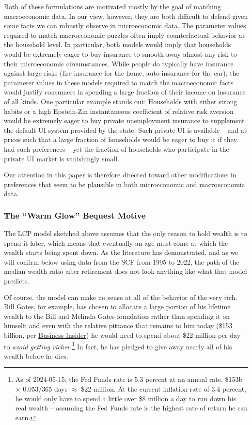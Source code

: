 \documentclass{article}
\begin{document}
Both of these formulations are motivated mostly by the goal of matching macroeconomic data.
In our view, however, they are both difficult to defend given some facts we can robustly observe in microeconomic data. The parameter values required to match macroeconomic puzzles often imply counterfactual behavior at the household level.
In particular, both models would imply that households would be extremely eager to buy insurance to smooth away almost any risk to their microeconomic circumstances.
While people do typically have insurance against large risks (fire insurance for the home, auto insurance for the car), the parameter values in these models required to match the macroeconomic facts would justify consumers in spending a large fraction of their income on insurance of all kinds.
One particular example stands out: Households with either strong habits or a high Epstein-Zin instantaneous coefficient of relative risk aversion would be extremely eager to buy private unemployment insurance to supplement the default UI system provided by the state.
Such private UI is available -- and at prices such that a large fraction of households would be eager to buy it if they had such preferences -- yet the fraction of households who participate in the private UI market is vanishingly small.

Our attention in this paper is therefore directed toward other modifications in preferences that seem to be plausible in both microeconomic and macroeconomic data.

\subsubsection{The ``Warm Glow'' Bequest Motive}

The LCP model sketched above assumes that the only reason to hold wealth is to spend it later, which means that eventually an age must come at which the wealth starts being spent down.
As the literature has demonstrated, and as we will confirm below using data from the SCF from 1995 to 2022, the path of the median wealth ratio after retirement does not look anything like what that model predicts.

Of course, the model can make no sense at all of the behavior of the very rich.
Bill Gates, for example, has chosen to allocate a large portion of his lifetime wealth to the Bill and Melinda Gates foundation rather than spending it on himself; and even with the relative pittance that remains to him today (\$153 billion, per \href{https://www.businessinsider.com/how-bill-gates-spends-fortune}{Business Insider}) he would need to spend about \$22 million per day to \textit{avoid getting richer}.\footnote{As of 2024-05-15, the Fed Funds rate is 5.3 percent at an annual rate.
\$153b $\times$ 0.053/365 days $\approx$ \$22 million.
At the current inflation rate of 3.4 percent, he would only have to spend a little over \$8 million a day to run down his real wealth -- assuming the Fed Funds rate is the highest rate of return he can earn.}
In fact, he has pledged to give away nearly all of his wealth before he dies.
\end{document}
